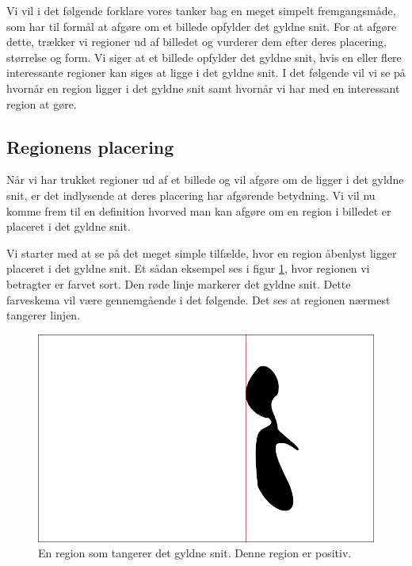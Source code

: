 {
\def\imgscale{0.34}

\textsf{Vi vil i det følgende forklare vores tanker bag en meget simpelt
fremgangsmåde, som har til formål at afgøre om et billede opfylder det
gyldne snit.  For at afgøre dette, trækker vi regioner ud af billedet og
vurderer dem efter deres placering, størrelse og form.  Vi siger at et
billede opfylder det gyldne snit, hvis en eller flere interessante
regioner kan siges at ligge i det gyldne snit.  I det følgende vil vi se
på hvornår en region ligger i det gyldne snit samt hvornår vi har med en
interessant region at gøre.
}

\subsection{Regionens placering}
Når vi har trukket regioner ud af et billede og vil afgøre om de ligger
i det gyldne snit, er det indlysende at deres placering har afgørende
betydning.  Vi vil nu komme frem til en definition hvorved man kan
afgøre om en region i billedet er placeret i det gyldne snit.

Vi starter med at se på det meget simple tilfælde, hvor en region
åbenlyst ligger placeret i det gyldne snit.  Et sådan eksempel ses i
figur \ref{pos_naiv_1}, hvor regionen vi betragter er farvet sort.  Den
røde linje markerer det gyldne snit.  Dette farveskema vil være
gennemgående i det følgende.  Det ses at regionen nærmest tangerer
linjen.

\begin{figure}[h]
	\begin{center}
		\includegraphics[scale=\imgscale,angle=0]{afsnit/vores_implementation/billeder/naiv_algoritme/naiv_positiv_blob_1}
	\end{center}
	\caption[En positiv region]{En region som tangerer det gyldne snit.
	Denne region er positiv.}
	\label{pos_naiv_1}
\end{figure}

}
